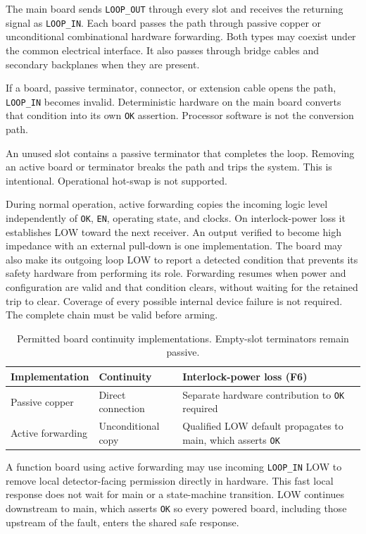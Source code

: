 The main board sends \texttt{LOOP\_OUT} through every slot and receives the returning signal as \texttt{LOOP\_IN}. Each board passes the path through passive copper or unconditional combinational hardware forwarding. Both types may coexist under the common electrical interface. It also passes through bridge cables and secondary backplanes when they are present.

If a board, passive terminator, connector, or extension cable opens the path, \texttt{LOOP\_IN} becomes invalid. Deterministic hardware on the main board converts that condition into its own \texttt{OK} assertion. Processor software is not the conversion path.

An unused slot contains a passive terminator that completes the loop. Removing an active board or terminator breaks the path and trips the system. This is intentional. Operational hot-swap is not supported.

During normal operation, active forwarding copies the incoming logic level independently of \texttt{OK}, \texttt{EN}, operating state, and clocks. On interlock-power loss it establishes LOW toward the next receiver. An output verified to become high impedance with an external pull-down is one implementation. The board may also make its outgoing loop LOW to report a detected condition that prevents its safety hardware from performing its role. Forwarding resumes when power and configuration are valid and that condition clears, without waiting for the retained trip to clear. Coverage of every possible internal device failure is not required. The complete chain must be valid before arming.

\begin{table}[htbp]
\centering
\small
\begin{tabularx}{\textwidth}{@{}l>{\raggedright\arraybackslash}X>{\raggedright\arraybackslash}X@{}}
\toprule
Implementation & Continuity & Interlock-power loss (F6) \\
\midrule
Passive copper & Direct connection & Separate hardware contribution to \texttt{OK} required \\
Active forwarding & Unconditional copy & Qualified LOW default propagates to main, which asserts \texttt{OK} \\
\bottomrule
\end{tabularx}
\caption{Permitted board continuity implementations. Empty-slot terminators remain passive.}
\end{table}

A function board using active forwarding may use incoming \texttt{LOOP\_IN} LOW to remove local detector-facing permission directly in hardware. This fast local response does not wait for main or a state-machine transition. LOW continues downstream to main, which asserts \texttt{OK} so every powered board, including those upstream of the fault, enters the shared safe response.

